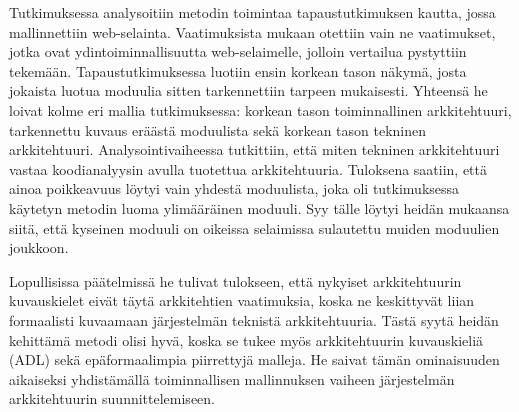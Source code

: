 \documentclass[finnish]{tktltiki2}
\theoremstyle{definition}
\theoremstyle{remark}
\begin{document}
Tutkimuksessa analysoitiin metodin toimintaa tapaustutkimuksen kautta, jossa mallinnettiin web-selainta. Vaatimuksista mukaan otettiin vain ne vaatimukset, jotka ovat ydintoiminnallisuutta web-selaimelle, jolloin vertailua pystyttiin tekemään. Tapaustutkimuksessa luotiin ensin korkean tason näkymä, josta jokaista luotua moduulia sitten tarkennettiin tarpeen mukaisesti. Yhteensä he loivat kolme eri mallia tutkimuksessa: korkean tason toiminnallinen arkkitehtuuri, tarkennettu kuvaus eräästä moduulista sekä korkean tason tekninen arkkitehtuuri. Analysointivaiheessa tutkittiin, että miten tekninen arkkitehtuuri vastaa koodianalyysin avulla tuotettua arkkitehtuuria. Tuloksena saatiin, että ainoa poikkeavuus löytyi vain yhdestä moduulista, joka oli tutkimuksessa käytetyn metodin luoma ylimääräinen moduuli. Syy tälle löytyi heidän mukaansa siitä, että kyseinen moduuli on oikeissa selaimissa sulautettu muiden moduulien joukkoon. 

Lopullisissa päätelmissä he tulivat tulokseen, että nykyiset arkkitehtuurin kuvauskielet eivät täytä arkkitehtien vaatimuksia, koska ne keskittyvät liian formaalisti kuvaamaan järjestelmän teknistä arkkitehtuuria. Tästä syytä heidän kehittämä metodi olisi hyvä, koska se tukee myös arkkitehtuurin kuvauskieliä (ADL) sekä epäformaalimpia piirrettyjä malleja. He saivat tämän ominaisuuden aikaiseksi yhdistämällä toiminnallisen mallinnuksen vaiheen järjestelmän arkkitehtuurin suunnittelemiseen.   
 







%
%
% 
%

%
%




% 
\end{document}
